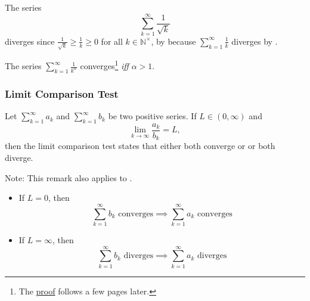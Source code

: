 \begin{exm}\label{exm-positive-series:3}
	The series
	\begin{equation*}
		\sum_{k=1}^\infty \frac{1}{\sqrt{k}}
	\end{equation*}
	diverges since $\tfrac{1}{\sqrt{k}}\geq\frac{1}{k}\geq0$ for all $k\in\mathbb{N}^\times$,
	by  because $ \sum_{k=1}^\infty\tfrac{1}{k}$ diverges
	by .
\end{exm}

\begin{thm}\label{thm-divergent-geometric-series}
	The series $\sum_{k=1}^\infty \tfrac{1}{k^\alpha}$ converges\footnote{The
		\hyperref[proof-divergent-geometric-series]{proof} follows a few pages later.}
	\textit{iff} $\alpha>1$.
\end{thm}

\subsubsection{Limit Comparison Test}\label{subsubsec-limit-comparison-test-series}

\begin{thm}\label{thm-limit-comparison-test-series}
	Let $\sum_{k=1}^\infty a_k$ and $\sum_{k=1}^\infty b_k$ be two positive series.
	If $L\in(0,\infty)$ and
	\begin{equation*}
		\lim_{k\to\infty}\frac{a_k}{b_k} = L,
	\end{equation*}
	then the limit comparison test states that either both converge or or both diverge.
\end{thm}

\begin{rem}\label{rem-limit-comparison-test-series}
	Note: This remark also applies to .
	\begin{itemize}
		\item If $L=0$, then
		      \begin{equation*}
			      \sum_{k=1}^\infty b_k \text{ converges} \implies \sum_{k=1}^\infty a_k \text{ converges}
		      \end{equation*}
		\item If $L=\infty$, then
		      \begin{equation*}
			      \sum_{k=1}^\infty b_k \text{ diverges} \implies \sum_{k=1}^\infty a_k \text{ diverges}
		      \end{equation*}
	\end{itemize}
\end{rem}

